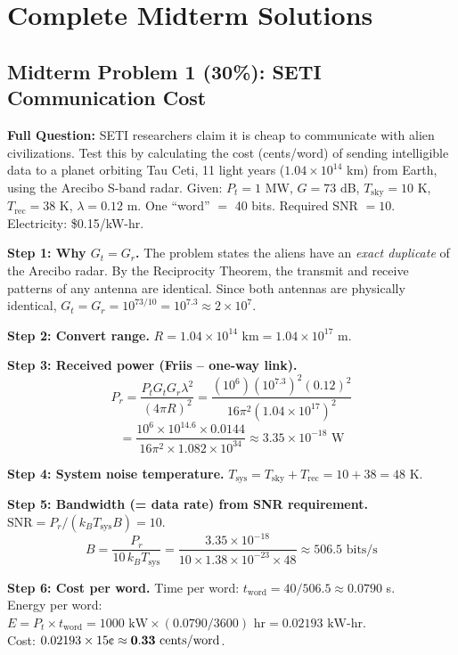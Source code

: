 \documentclass[10pt,letterpaper]{article}
\begin{document}
\section{Complete Midterm Solutions}

\subsection{Midterm Problem 1 (30\%): SETI Communication Cost}

\textbf{Full Question:} SETI researchers claim it is cheap to communicate with alien civilizations. Test this by calculating the cost (cents/word) of sending intelligible data to a planet orbiting Tau Ceti, 11 light years ($1.04\times10^{14}$ km) from Earth, using the Arecibo S-band radar. Given: $P_t = 1$ MW, $G = 73$ dB, $T_\mathrm{sky} = 10$ K, $T_\mathrm{rec} = 38$ K, $\lambda = 0.12$ m. One ``word'' $=$ 40 bits. Required SNR $= 10$. Electricity: \$0.15/kW-hr.

\begin{tcolorbox}[examplebox, title={Full Solution}]
\textbf{Step 1: Why $G_t = G_r$.}
The problem states the aliens have an \emph{exact duplicate} of the Arecibo radar. By the Reciprocity Theorem, the transmit and receive patterns of any antenna are identical. Since both antennas are physically identical, $G_t = G_r = 10^{73/10} = 10^{7.3} \approx 2\times10^7$.

\textbf{Step 2: Convert range.}
$R = 1.04\times10^{14}\text{ km} = 1.04\times10^{17}$ m.

\textbf{Step 3: Received power (Friis -- one-way link).}
\[P_r = \frac{P_t G_t G_r\lambda^2}{(4\pi R)^2} = \frac{(10^6)(10^{7.3})^2(0.12)^2}{16\pi^2(1.04\times10^{17})^2}\]
\[= \frac{10^6\times10^{14.6}\times0.0144}{16\pi^2\times1.082\times10^{34}} \approx 3.35\times10^{-18}\text{ W}\]

\textbf{Step 4: System noise temperature.}
$T_\mathrm{sys} = T_\mathrm{sky} + T_\mathrm{rec} = 10 + 38 = 48$ K.

\textbf{Step 5: Bandwidth (= data rate) from SNR requirement.}
$\mathrm{SNR} = P_r/(k_B T_\mathrm{sys}B) = 10$.
\[B = \frac{P_r}{10\,k_B T_\mathrm{sys}} = \frac{3.35\times10^{-18}}{10\times1.38\times10^{-23}\times48} \approx 506.5\text{ bits/s}\]

\textbf{Step 6: Cost per word.}
Time per word: $t_\mathrm{word} = 40/506.5 \approx 0.0790$ s.\\
Energy per word: $E = P_t\times t_\mathrm{word} = 1000\text{ kW}\times(0.0790/3600)\text{ hr} = 0.02193\text{ kW-hr}$.\\
Cost: $0.02193\times15\text{\textcent} \approx \mathbf{0.33\text{ cents/word}}$.
\end{tcolorbox}
\end{document}
